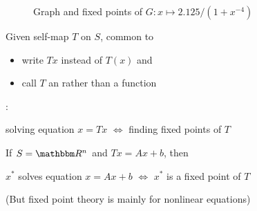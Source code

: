 \begin{frame}
    
    \begin{figure}
        \centering
        \caption{\label{f:three_fixed_points} 
            Graph and fixed points of $G \colon x \mapsto 2.125/(1 + x^{-4})$ }
    \end{figure}

\end{frame}


\begin{frame}

    Given self-map $T$ on $S$, common to 
    \begin{itemize}
        \item write $T x$ instead of $T(x)$ and 
            \vspace{0.4em}
        \item call $T$ an  rather than a function
    \end{itemize}

            \vspace{0.4em}
    : 
    \begin{center}
        solving equation $x = Tx$ $\iff$ finding fixed points of  $T$
    \end{center}


    \Eg If $S = \RR^n$ and $T x = Ax + b$, then 
    \begin{center}
        $x^*$ solves equation  $x = Ax + b$
        $\iff$ 
        $x^*$ is a fixed point of $T$ 
    \end{center}


    (But fixed point theory is mainly for nonlinear equations)

    
\end{frame}


